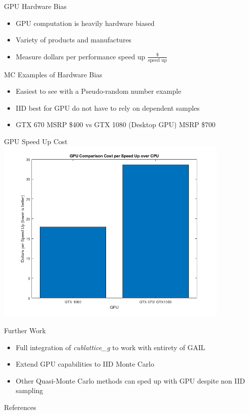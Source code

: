 \documentclass[11pt]{beamer}
\begin{document}
\begin{frame}{GPU Hardware Bias}
\begin{itemize}
\item GPU computation is heavily hardware biased
\item Variety of products and manufactures
\item Measure dollars per performance speed up $\frac{\$}{\text{speed up}}$
\end{itemize}
\end{frame}

\begin{frame}{MC Examples of Hardware Bias}%
\begin{itemize}
\item Easiest to see with a Pseudo-random number example
\item IID best for GPU do not have to rely on dependent samples
\item GTX 670 MSRP \$400 vs GTX 1080 (Desktop GPU) MSRP \$700
\end{itemize}
\end{frame}

\begin{frame}{GPU Speed Up Cost}
\centering
\includegraphics[width=0.85\textwidth]{gpuspeedup.png} 
\end{frame}

\begin{frame}{Further Work}
\begin{itemize}
\item Full integration of \textit{cublattice\_g} to work with entirety of GAIL
\item Extend GPU capabilities to IID Monte Carlo 
\item Other Quasi-Monte Carlo methods can sped up with GPU despite non IID sampling
\end{itemize}
\end{frame}

\begin{frame}{References}


\end{frame}
\end{document}

